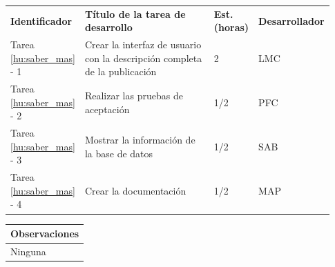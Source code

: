 \documentclass[11pt]{article}
\begin{document}
\vspace{-0.8cm}
\begin{longtable}{p{0.18\linewidth}|p{0.48\linewidth}|p{0.1\linewidth}|p{0.17\linewidth}}
  \toprule
  \textbf{Identificador} & \textbf{Título de la tarea de desarrollo} & \textbf{Est. (horas)} & \textbf{Desarrollador} \\
  Tarea \ref{hu:saber_mas} - 1 & Crear la interfaz de usuario con la descripción completa de la publicación & 2 & LMC\\
  Tarea \ref{hu:saber_mas} - 2 & Realizar las pruebas de aceptación  & 1/2 & PFC\\
  Tarea \ref{hu:saber_mas} - 3 & Mostrar la información de la base de datos & 1/2 & SAB\\
  Tarea \ref{hu:saber_mas} - 4 & Crear la documentación & 1/2 & MAP \\
  \bottomrule
\end{longtable}
\vspace{-0.8cm}
\begin{longtable}{p{1.028\linewidth}}
  \textbf{Observaciones}\\
  \midrule
  Ninguna\\
  \bottomrule
\end{longtable}
\end{document}

